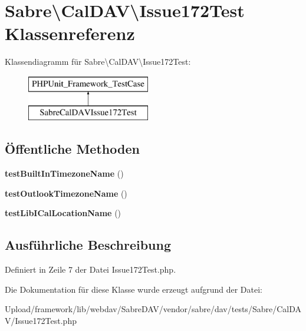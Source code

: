\hypertarget{class_sabre_1_1_cal_d_a_v_1_1_issue172_test}{}\section{Sabre\textbackslash{}Cal\+D\+AV\textbackslash{}Issue172\+Test Klassenreferenz}
\label{class_sabre_1_1_cal_d_a_v_1_1_issue172_test}
Klassendiagramm für Sabre\textbackslash{}Cal\+D\+AV\textbackslash{}Issue172\+Test\+:\begin{figure}[H]
\begin{center}
\leavevmode
\includegraphics[height=2.000000cm]{class_sabre_1_1_cal_d_a_v_1_1_issue172_test}
\end{center}
\end{figure}
\subsection*{Öffentliche Methoden}
\begin{DoxyCompactItemize}
\item 
\mbox{\label{class_sabre_1_1_cal_d_a_v_1_1_issue172_test_a8523e4845f2f193b28bb23831ad0b473}} 
{\bfseries test\+Built\+In\+Timezone\+Name} ()
\item 
\mbox{\label{class_sabre_1_1_cal_d_a_v_1_1_issue172_test_a2ee2c18d377fea8cd41856a6b42fd7f4}} 
{\bfseries test\+Outlook\+Timezone\+Name} ()
\item 
\mbox{\label{class_sabre_1_1_cal_d_a_v_1_1_issue172_test_a311005267f6da625c3f8ad4a6c74ea8c}} 
{\bfseries test\+Lib\+I\+Cal\+Location\+Name} ()
\end{DoxyCompactItemize}


\subsection{Ausführliche Beschreibung}


Definiert in Zeile 7 der Datei Issue172\+Test.\+php.



Die Dokumentation für diese Klasse wurde erzeugt aufgrund der Datei\+:\begin{DoxyCompactItemize}
\item 
Upload/framework/lib/webdav/\+Sabre\+D\+A\+V/vendor/sabre/dav/tests/\+Sabre/\+Cal\+D\+A\+V/Issue172\+Test.\+php\end{DoxyCompactItemize}
